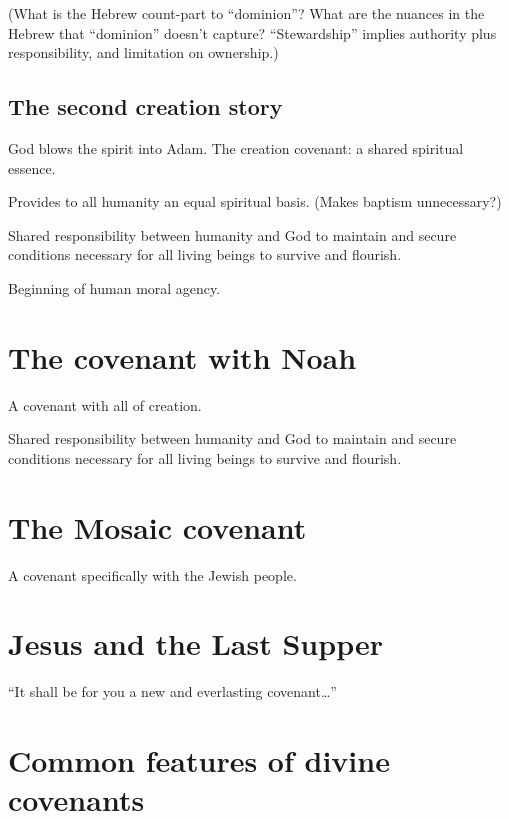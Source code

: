 \documentclass[
]{book}
\begin{document}
(What is the Hebrew count-part to ``dominion''? What are the nuances in
the Hebrew that ``dominion'' doesn't capture? ``Stewardship'' implies
authority plus responsibility, and limitation on ownership.)

\hypertarget{the-second-creation-story}{%
\subsection{The second creation story}\label{the-second-creation-story}}

God blows the spirit into Adam.
The creation covenant: a shared spiritual essence.

Provides to all humanity an equal spiritual basis. (Makes baptism
unnecessary?)

Shared responsibility between humanity and God to maintain and secure
conditions necessary for all living beings to survive and flourish.

Beginning of human moral agency.

\hypertarget{the-covenant-with-noah}{%
\section{The covenant with Noah}\label{the-covenant-with-noah}}

A covenant with all of creation.

Shared responsibility between humanity and God to maintain and secure
conditions necessary for all living beings to survive and flourish.

\hypertarget{the-mosaic-covenant}{%
\section{The Mosaic covenant}\label{the-mosaic-covenant}}

A covenant specifically with the Jewish people.

\hypertarget{jesus-and-the-last-supper}{%
\section{Jesus and the Last Supper}\label{jesus-and-the-last-supper}}

``It shall be for you a new and everlasting covenant\ldots{}''

\hypertarget{common-features-of-divine-covenants}{%
\section{Common features of divine covenants}\label{common-features-of-divine-covenants}}
\end{document}
